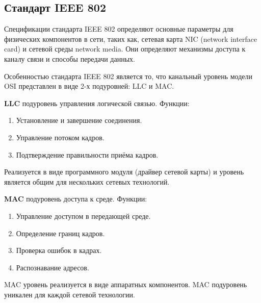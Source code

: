 \documentclass[12pt, russian, oneside, article]{ncc}
\begin{document}
\subsection{Стандарт IEEE 802}
\label{sec-5_2}


Спецификации стандарта IEEE 802 определяют основные параметры для физических компонентов в сети, таких как, сетевая карта NIC (network interface card) и сетевой среды network media. Они определяют механизмы доступа к каналу связи и способы передачи данных.

Особенностью стандарта IEEE 802 является то, что канальный уровень модели OSI представлен в виде 2-х подуровней: LLC и MAC.

\textbf{LLC} подуровень управления логической связью. Функции:
\begin{enumerate}
\item Установление и завершение соединения.
\item Управление потоком кадров.
\item Подтверждение правильности приёма кадров.
\end{enumerate}

Реализуется в виде программного модуля (драйвер сетевой карты) и уровень является общим для нескольких сетевых технологий.

\textbf{MAC} подуровень доступа к среде. Функции:
\begin{enumerate}
\item Управление доступом в передающей среде.
\item Определение границ кадров.
\item Проверка ошибок в кадрах.
\item Распознавание адресов.
\end{enumerate}

MAC уровень реализуется в виде аппаратных компонентов. MAC подуровень уникален для каждой сетевой технологии.
\end{document}
